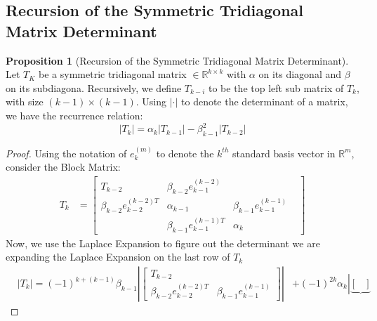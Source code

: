 \documentclass[]{article}
\theoremstyle{definition}
\newtheorem{prop}{Proposition}[section]  %
\begin{document}
\begin{appendices}
        \subsection{Recursion of the Symmetric Tridiagonal Matrix Determinant}
            \begin{prop}[Recursion of the Symmetric Tridiagonal Matrix Determinant]\label{prop:Recursion_of_the_Symmetric_Tridiagonal_Matrix_Determinant}
                Let $T_K$ be a symmetric tridiagonal matrix $\in \mathbb{R}^{k\times k}$ with $\alpha$ on its diagonal and $\beta$ on its subdiagona. Recursively, we define $T_{k - i}$ to be the top left sub matrix of $T_k$, with size $(k - 1)\times(k - 1)$. Using $|\cdot|$ to denote the determinant of a matrix, we have the recurrence relation: 
                $$
                    |T_k| = \alpha_k|T_{k - 1}| - \beta_{k - 1}^2|T_{k - 2}|
                $$
            \end{prop}
            \begin{proof}
                Using the notation of $e_{k}^{(m)}$ to denote the $k^{th}$ standard basis vector in $\mathbb{R}^m$, consider the Block Matrix: 
                \begin{align}
                    T_k &= \begin{bmatrix}
                        T_{k - 2} & \beta_{k - 2}e_{k - 1}^{(k - 2)} & 
                        \\
                        \beta_{k - 2}e_{k - 2}^{(k - 2)T} & \alpha_{k - 1}  & \beta_{k - 1}e_{k - 1}^{(k - 1)}
                        \\
                        & \beta_{k - 1}e_{k - 1}^{(k - 1)T} & \alpha_k&
                    \end{bmatrix}
                \end{align}
                Now, we use the Laplace Expansion to figure out the determinant we are expanding the Laplace Expansion on the last row of $T_k$
                \begin{align}
                    &|T_k| = (-1)^{k+(k - 1)}\beta_{k - 1} \left|\begin{bmatrix}
                        T_{k - 2} & 
                        \\
                        \beta_{k - 2}e^{(k - 2)T}_{k - 2} & \beta_{k - 1}e_{k - 1}^{(k - 1)}
                    \end{bmatrix}\right|&
                     + 
                    (-1)^{2k} \alpha_k
                    \left|
                        \underbrace{\begin{bmatrix}

\end{bmatrix}}
\end{align}
\end{proof}
\end{appendices}
\end{document}
